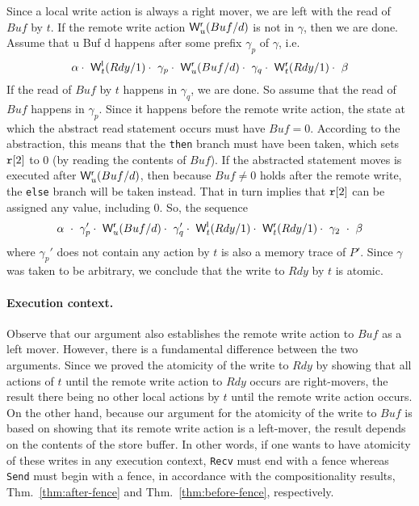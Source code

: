 Since a local write action is always a right mover, we are left with the read of $Buf$ by $t$.
If the remote write action $\mathsf{W}^{\mathsf{r}}_{u}(Buf/d)$ is not in $\gamma$, then we are done.
Assume that \remwritex u {Buf} d happens after some prefix $\gamma_p$ of $\gamma$, i.e.
\[
\alpha\cdot\ \locwritex t {Rdy} 1\cdot\ \gamma_p\cdot\ \remwritex u {Buf} d\cdot\ \gamma_q\cdot\ \remwritex t {Rdy} 1\cdot\ \beta
\]
If the read of $Buf$ by $t$ happens in $\gamma_q$, we are done.
So assume that the read of $Buf$ happens in $\gamma_p$.
Since it happens before the remote write action, the state at which the abstract read statement occurs must have $Buf=0$.
According to the abstraction, this means that the {\tt then} branch must have been taken, which sets $\mathtt{r}[2]$ to 0 (by reading the contents of $Buf$).
If the abstracted statement moves is executed after $\mathsf{W}^{\mathsf{r}}_{u}(Buf/d)$, then because $Buf\neq 0$ holds after the remote write, the {\tt else} branch will be taken instead.
That in turn implies that $\mathtt{r}[2]$ can be assigned any value, including 0. 
So, the sequence
\[
\alpha\ \cdot\ \gamma_p'\cdot\ \remwritex u {Buf} d\cdot\ \gamma_q'\cdot\ \locwritex t {Rdy} 1\cdot\ \remwritex t {Rdy} 1\cdot\ \gamma_2\ \cdot\ \beta
\]
where $\gamma_p'$ does not contain any action by $t$ is also a memory trace of $P'$.
Since $\gamma$ was taken to be arbitrary, we conclude that the write to $Rdy$ by $t$ is atomic.

\paragraph{Execution context.}
Observe that our argument also establishes the remote write action to $Buf$ as a left mover. 
However, there is a fundamental difference between the two arguments.
Since we proved the atomicity of the write to $Rdy$ by showing that all actions of $t$ until the remote write action to $Rdy$ occurs are right-movers, the result there being no other local actions by $t$ until the remote write action occurs. 
On the other hand, because our argument for the atomicity of the write to $Buf$ is based on showing that its remote write action is a left-mover, the result depends on the contents of the store buffer. 
In other words, if one wants to have atomicity of these writes in any execution context, {\tt Recv} must end with a fence whereas {\tt Send} must begin with a fence, in accordance with the compositionality results, Thm.~\ref{thm:after-fence} and Thm.~\ref{thm:before-fence}, respectively.

